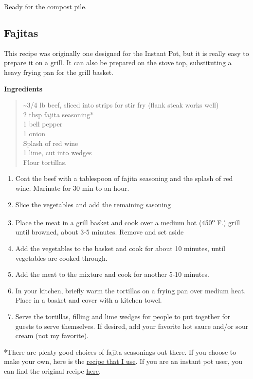 \documentclass[
]{book}
\providecommand{\tightlist}{%
  \setlength{\itemsep}{0pt}\setlength{\parskip}{0pt}}
\begin{document}
Ready for the compost pile.

\hypertarget{fajitas}{%
\subsection{Fajitas}\label{fajitas}}

This recipe was originally one designed for the Instant Pot, but it is really easy to prepare it on a grill. It can also be prepared on the stove top, substituting a heavy frying pan for the grill basket.

\textbf{Ingredients}

\begin{quote}
\textasciitilde3/4 lb beef, sliced into strips for stir fry (flank steak works well)\\
2 tbsp fajita seasoning*\\
1 bell pepper\\
1 onion\\
Splash of red wine\\
1 lime, cut into wedges\\
Flour tortillas.
\end{quote}

\begin{enumerate}
\def\labelenumi{\arabic{enumi}.}
\setcounter{enumi}{1}
\tightlist
\item
  Coat the beef with a tablespoon of fajita seasoning and the splash of red wine. Marinate for 30 min to an hour.
\item
  Slice the vegetables and add the remaining sasoning
\item
  Place the meat in a grill basket and cook over a medium hot (450\textsuperscript{o} F.) grill until browned, about 3-5 minutes. Remove and set aside
\item
  Add the vegetables to the basket and cook for about 10 minutes, until vegetables are cooked through.
\item
  Add the meat to the mixture and cook for another 5-10 minutes.
\item
  In your kitchen, briefly warm the tortillas on a frying pan over medium heat. Place in a basket and cover with a kitchen towel.
\item
  Serve the tortillas, filling and lime wedges for people to put together for guests to serve themselves. If desired, add your favorite hot sauce and/or sour cream (not my favorite).
\end{enumerate}

*There are plenty good choices of fajita seasonings out there. If you choose to make your own, here is the \href{https://littlesunnykitchen.com/fajita-seasoning/}{recipe that I use}. If you are an instant pot user, you can find the original recipe \href{https://www.theinstantpottable.com/instant-pot-steak-fajitas/}{here}.
\end{document}
